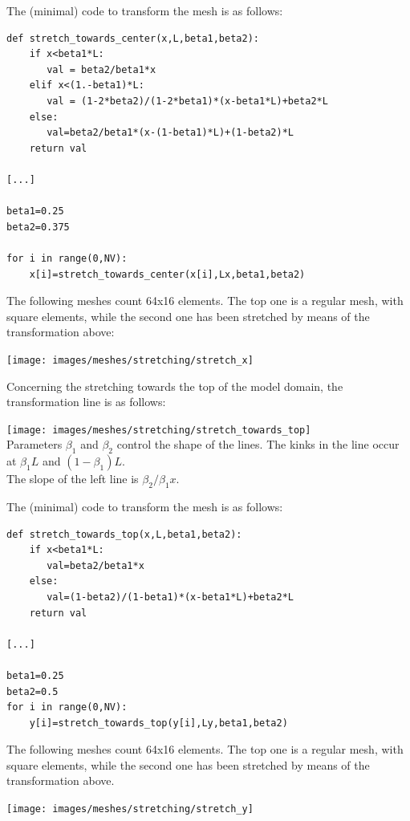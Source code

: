 The (minimal) code to transform the mesh is as follows:
\begin{lstlisting}
def stretch_towards_center(x,L,beta1,beta2):
    if x<beta1*L: 
       val = beta2/beta1*x
    elif x<(1.-beta1)*L: 
       val = (1-2*beta2)/(1-2*beta1)*(x-beta1*L)+beta2*L
    else:
       val=beta2/beta1*(x-(1-beta1)*L)+(1-beta2)*L
    return val

[...]

beta1=0.25
beta2=0.375

for i in range(0,NV):
    x[i]=stretch_towards_center(x[i],Lx,beta1,beta2)
\end{lstlisting}

The following meshes count 64x16 elements. The top one is a regular mesh, with square elements, 
while the second one has been stretched by means of the transformation above:

\begin{center}
\texttt{[image: images/meshes/stretching/stretch\_x]}
\end{center}

Concerning the stretching towards the top of the model domain, the transformation line is as follows:

\begin{center}
\texttt{[image: images/meshes/stretching/stretch\_towards\_top]}\\
{\captionfont Parameters $\beta_1$ and $\beta_2$ control the shape of the lines. The kinks in the 
line occur at $\beta_1 L$ and $(1-\beta_1)L$.\\ The slope of the left line is $\beta_2/\beta_1 x$.}
\end{center}

The (minimal) code to transform the mesh is as follows:
\begin{lstlisting}
def stretch_towards_top(x,L,beta1,beta2):
    if x<beta1*L: 
       val=beta2/beta1*x
    else:
       val=(1-beta2)/(1-beta1)*(x-beta1*L)+beta2*L
    return val

[...]

beta1=0.25
beta2=0.5
for i in range(0,NV):
    y[i]=stretch_towards_top(y[i],Ly,beta1,beta2)
\end{lstlisting}


The following meshes count 64x16 elements. The top one is a regular mesh, with square elements, 
while the second one has been stretched by means of the transformation above.
\begin{center}
\texttt{[image: images/meshes/stretching/stretch\_y]}
\end{center}

